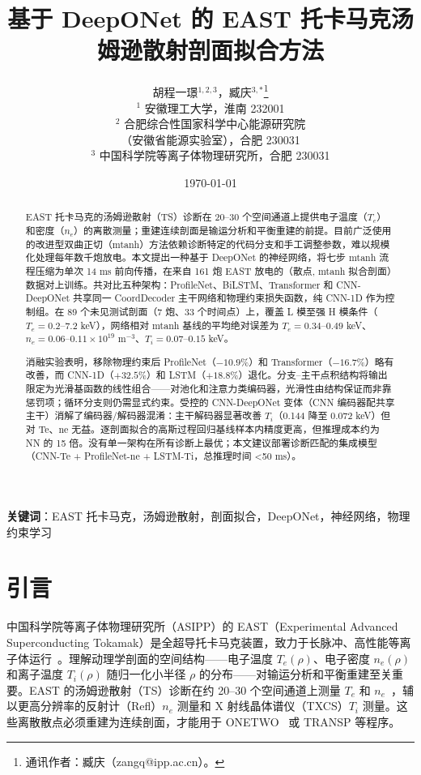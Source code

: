 \documentclass[a4paper,12pt]{ctexart}
\title{基于 DeepONet 的 EAST 托卡马克汤姆逊散射剖面拟合方法}
\author{%
胡程一璟$^{1,2,3}$，臧庆$^{3,\ast}$\thanks{通讯作者：臧庆（zangq@ipp.ac.cn）。} \\[4pt]
$^1$ 安徽理工大学，淮南 232001 \\
$^2$ 合肥综合性国家科学中心能源研究院 \\
（安徽省能源实验室），合肥 230031 \\
$^3$ 中国科学院等离子体物理研究所，合肥 230031
}
\date{\today}
\begin{document}
\maketitle

\begin{abstract}
\small
EAST 托卡马克的汤姆逊散射（TS）诊断在 20--30 个空间通道上提供电子温度（$T_e$）和密度（$n_e$）的离散测量；重建连续剖面是输运分析和平衡重建的前提。目前广泛使用的改进型双曲正切（mtanh）方法依赖诊断特定的代码分支和手工调整参数，难以规模化处理每年数千炮放电。本文提出一种基于 DeepONet 的神经网络，将七步 mtanh 流程压缩为单次 14 ms 前向传播，在来自 161 炮 EAST 放电的（散点, mtanh 拟合剖面）数据对上训练。共对比五种架构：ProfileNet、BiLSTM、Transformer 和 CNN-DeepONet 共享同一 CoordDecoder 主干网络和物理约束损失函数，纯 CNN-1D 作为控制组。在 89 个未见测试剖面（7 炮、33 个时间点）上，覆盖 L 模至强 H 模条件（$T_e = 0.2$--$7.2$ keV），网络相对 mtanh 基线的平均绝对误差为 $T_e = 0.34$--$0.49$ keV、$n_e = 0.06$--$0.11 \times 10^{19}$ m$^{-3}$、$T_i = 0.07$--$0.15$ keV。

消融实验表明，移除物理约束后 ProfileNet（$-10.9\%$）和 Transformer（$-16.7\%$）略有改善，而 CNN-1D（$+32.5\%$）和 LSTM（$+18.8\%$）退化。分支--主干点积结构将输出限定为光滑基函数的线性组合——对池化和注意力类编码器，光滑性由结构保证而非靠惩罚项；循环分支则仍需显式约束。受控的 CNN-DeepONet 变体（CNN 编码器配共享主干）消解了编码器/解码器混淆：主干解码器显著改善 $T_i$（0.144 降至 0.072 keV）但对 Te、ne 无益。逐剖面拟合的高斯过程回归基线样本内精度更高，但推理成本约为 NN 的 15 倍。没有单一架构在所有诊断上最优；本文建议部署诊断匹配的集成模型（CNN-Te + ProfileNet-ne + LSTM-Ti，总推理时间 <50 ms）。
\end{abstract}

\noindent\textbf{关键词}：EAST 托卡马克，汤姆逊散射，剖面拟合，DeepONet，神经网络，物理约束学习

\section{引言}

中国科学院等离子体物理研究所（ASIPP）的 EAST（Experimental Advanced Superconducting Tokamak）是全超导托卡马克装置，致力于长脉冲、高性能等离子体运行~\cite{east_overview}。理解动理学剖面的空间结构——电子温度 $T_e(\rho)$、电子密度 $n_e(\rho)$ 和离子温度 $T_i(\rho)$ 随归一化小半径 $\rho$ 的分布——对输运分析和平衡重建至关重要。EAST 的汤姆逊散射（TS）诊断在约 20--30 个空间通道上测量 $T_e$ 和 $n_e$~\cite{east_ts,east_tvts}，辅以更高分辨率的反射计（Refl）$n_e$ 测量和 X 射线晶体谱仪（TXCS）$T_i$ 测量。这些离散散点必须重建为连续剖面，才能用于 ONETWO~\cite{onetwo} 或 TRANSP 等程序。
\end{document}
